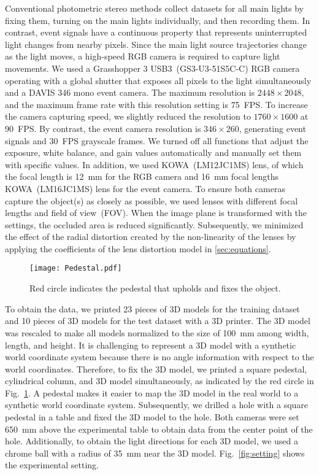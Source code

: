 Conventional photometric stereo methods collect datasets for all main lights by fixing them, turning on the main lights individually, and then recording them. In contrast, event signals have a continuous property that represents uninterrupted light changes from nearby pixels. Since the main light source trajectories change as the light moves, a high-speed RGB camera is required to capture light movements. We used a Grasshopper 3 USB3~(GS3-U3-51S5C-C) RGB camera operating with a global shutter that exposes all pixels to the light simultaneously and a DAVIS 346 mono event camera. The maximum resolution is $2448 \times 2048$, and the maximum frame rate with this resolution setting is 75~FPS. To increase the camera capturing speed, we slightly reduced the resolution to $1760 \times 1600$ at 90~FPS. By contrast, the event camera resolution is $346 \times 260$, generating event signals and 30~FPS grayscale frames. We turned off all functions that adjust the exposure, white balance, and gain values automatically and manually set them with specific values. In addition, we used KOWA~(LM12JC1MS) lens, of which the focal length is 12~mm for the RGB camera and 16~mm focal lengths KOWA~(LM16JC1MS) lens for the event camera. To ensure both cameras capture the object(s) as closely as possible, we used lenses with different focal lengths and field of view~(FOV). When the image plane is transformed with the settings, the occluded area is reduced significantly. Subsequently, we minimized the effect of the radial distortion created by the non-linearity of the lenses by applying the coefficients of the lens distortion model in \ref{sec:equations}.


\begin{figure}[t]
    \centering
    \texttt{[image: Pedestal.pdf]}
    \caption{Red circle indicates the pedestal that upholds and fixes the object.}
    \label{fig:Pedestal}
\end{figure}
To obtain the data, we printed 23 pieces of 3D models for the training dataset and 10 pieces of 3D models for the test dataset with a 3D printer. The 3D model was rescaled to make all models normalized to the size of 100~mm among width, length, and height. It is challenging to represent a 3D model with a synthetic world coordinate system because there is no angle information with respect to the world coordinates. Therefore, to fix the 3D model, we printed a square pedestal, cylindrical column, and 3D model simultaneously, as indicated by the red circle in Fig.~\ref{fig:Pedestal}. A pedestal makes it easier to map the 3D model in the real world to a synthetic world coordinate system. Subsequently, we drilled a hole with a square pedestal in a table and fixed the 3D model to the hole. Both cameras were set 650~mm above the experimental table to obtain data from the center point of the hole. Additionally, to obtain the light directions for each 3D model, we used a chrome ball with a radius of 35~mm near the 3D model. Fig.~\ref{fig:setting} shows the experimental setting.


